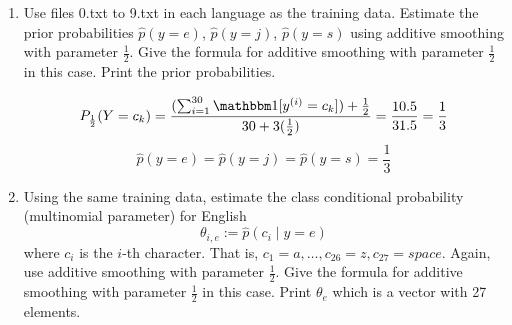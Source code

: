 \documentclass[a4paper]{article}
\theoremstyle{definition}
\def\ind{\mathbbm 1}
\newenvironment{soln}{
    \leavevmode\color{blue}\ignorespaces
}{}
\begin{document}
\begin{enumerate}
\item
Use files 0.txt to 9.txt in each language as the training data.
Estimate the prior probabilities 
$\hat p(y=e)$,
$\hat p(y=j)$,
$\hat p(y=s)$
using additive smoothing with parameter $\frac{1}{2}$. 
Give the formula for additive smoothing with parameter $\frac{1}{2}$ in this case. 
Print the prior probabilities.

\begin{soln}
    $$
    P_{\frac{1}{2}}(Y = c_k) = \frac{(\sum_{i = 1}^{30}\ind [y^{(i)} = c_k]) + \frac{1}{2}}{30 + 3 (\frac{1}{2})} = \frac{10.5}{31.5} = \frac{1}{3}
    $$
    $$
    \hat p(y=e) = \hat p(y=j) = \hat p(y=s) = \frac{1}{3}
    $$
\end{soln}

\item
Using the same training data, estimate the class conditional probability (multinomial parameter) for English
$$\theta_{i,e} := \hat p(c_i \mid y=e)$$ 
where $c_i$ is the $i$-th character. That is, $c_1 = a, \ldots, c_{26} = z, c_{27} = space$.
Again, use additive smoothing with parameter $\frac{1}{2}$.
Give the formula for additive smoothing with parameter $\frac{1}{2}$ in this case. 
Print $\theta_e$ which is a vector with 27 elements.


\end{enumerate}
\end{document}
